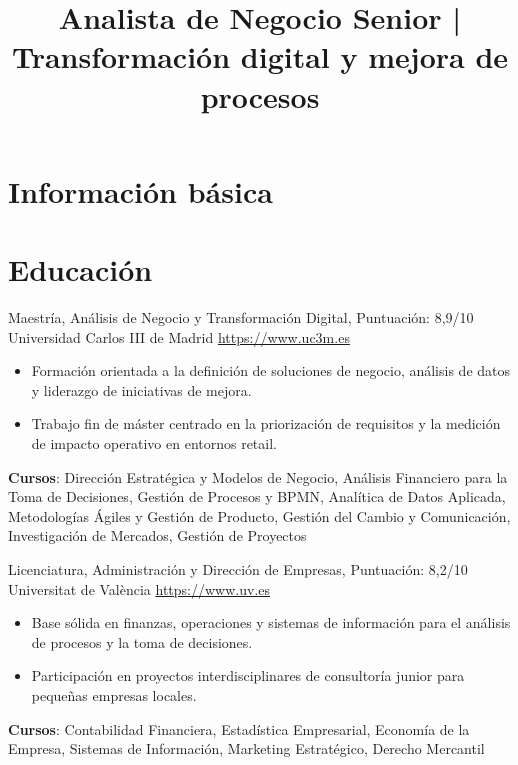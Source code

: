 \documentclass[a4paper, serif, 10pt]{moderncv}
\title{Analista de Negocio Senior | Transformación digital y mejora de procesos}
\begin{document}
\maketitle

\section{Información básica}

\section{Educación}

        {Maestría, Análisis de Negocio y Transformación Digital, Puntuación: 8,9/10}
        {Universidad Carlos III de Madrid}
        {\url{https://www.uc3m.es}}
        {}
        {\begin{itemize}
\item Formación orientada a la definición de soluciones de negocio, análisis de datos y liderazgo de iniciativas de mejora.
\item Trabajo fin de máster centrado en la priorización de requisitos y la medición de impacto operativo en entornos retail.
\end{itemize}
\textbf{Cursos}: Dirección Estratégica y Modelos de Negocio, Análisis Financiero para la Toma de Decisiones, Gestión de Procesos y BPMN, Analítica de Datos Aplicada, Metodologías Ágiles y Gestión de Producto, Gestión del Cambio y Comunicación, Investigación de Mercados, Gestión de Proyectos}

        {Licenciatura, Administración y Dirección de Empresas, Puntuación: 8,2/10}
        {Universitat de València}
        {\url{https://www.uv.es}}
        {}
        {\begin{itemize}
\item Base sólida en finanzas, operaciones y sistemas de información para el análisis de procesos y la toma de decisiones.
\item Participación en proyectos interdisciplinares de consultoría junior para pequeñas empresas locales.
\end{itemize}
\textbf{Cursos}: Contabilidad Financiera, Estadística Empresarial, Economía de la Empresa, Sistemas de Información, Marketing Estratégico, Derecho Mercantil}
\end{document}
